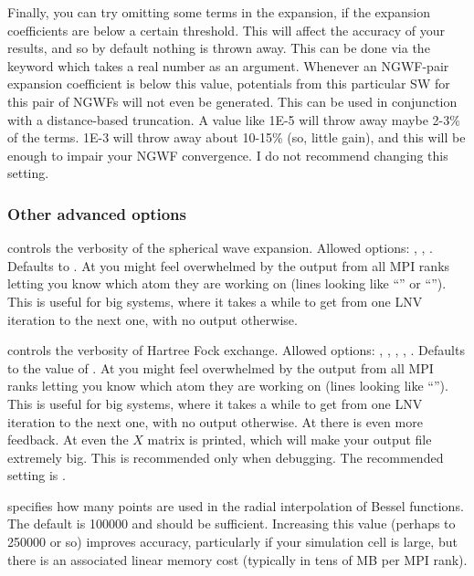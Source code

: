 \documentclass[letterpaper,10pt,english]{sphinxmanual}
\begin{document}
Finally, you can try omitting some terms in the expansion, if the
expansion coefficients are below a certain threshold. This will affect
the accuracy of your results, and so by default nothing is thrown away.
This can be done via the keyword  which takes a real
number as an argument. Whenever an NGWF-pair expansion coefficient is
below this value, potentials from this particular SW for this pair of
NGWFs will not even be generated. This can be used in conjunction with a
distance-based truncation. A value like 1E-5 will throw away maybe 2-3\%
of the terms. 1E-3 will throw away about 10-15\% (so, little gain), and
this will be enough to impair your NGWF convergence. I do not recommend
changing this setting.


\subsubsection{Other advanced options}
\label{\detokenize{hfx:other-advanced-options}}
 \textendash{} controls the verbosity of the spherical
wave expansion. Allowed options: , , .
Defaults to . At  you might feel overwhelmed by the
output from all MPI ranks letting you know which atom they are working
on (lines looking like “” or “”). This is useful for
big systems, where it takes a while to get from one LNV iteration to the
next one, with no output otherwise.

 \textendash{} controls the verbosity of Hartree Fock
exchange. Allowed options: , , ,
, . Defaults to the value of . At
 you might feel overwhelmed by the output from all MPI ranks
letting you know which atom they are working on (lines looking like
“”). This is useful for big systems, where it takes a
while to get from one LNV iteration to the next one, with no output
otherwise. At  there is even more feedback. At 
even the \(X\) matrix is printed, which will make your output file
extremely big. This is recommended only when debugging. The recommended
setting is .

 \textendash{} specifies how many points are used
in the radial interpolation of Bessel functions. The default is 100000
and should be sufficient. Increasing this value (perhaps to 250000 or
so) improves accuracy, particularly if your simulation cell is large,
but there is an associated linear memory cost (typically in tens of MB
per MPI rank).
\end{document}
